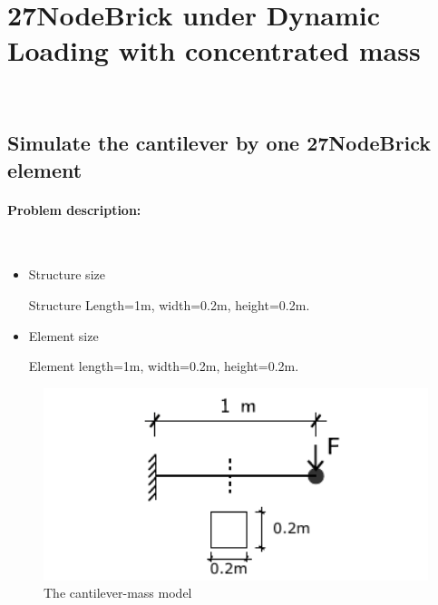 
\newpage
\section{27NodeBrick under Dynamic Loading with concentrated mass} ~ 
\subsection{Simulate the cantilever by one 27NodeBrick element} 
\paragraph{Problem description:} ~

\begin{itemize}
  \item Structure size

    Structure Length=1m, width=0.2m, height=0.2m.

  \item Element size

    Element length=1m, width=0.2m, height=0.2m.
\end{itemize}

\begin{figure}[!htb]
  \centering
  \includegraphics[width=12cm]{./Figure-files/_Chapter_Appendix_Illustrative_Examples/cantilever-mass.pdf}
  \caption{The cantilever-mass model}
\end{figure}


